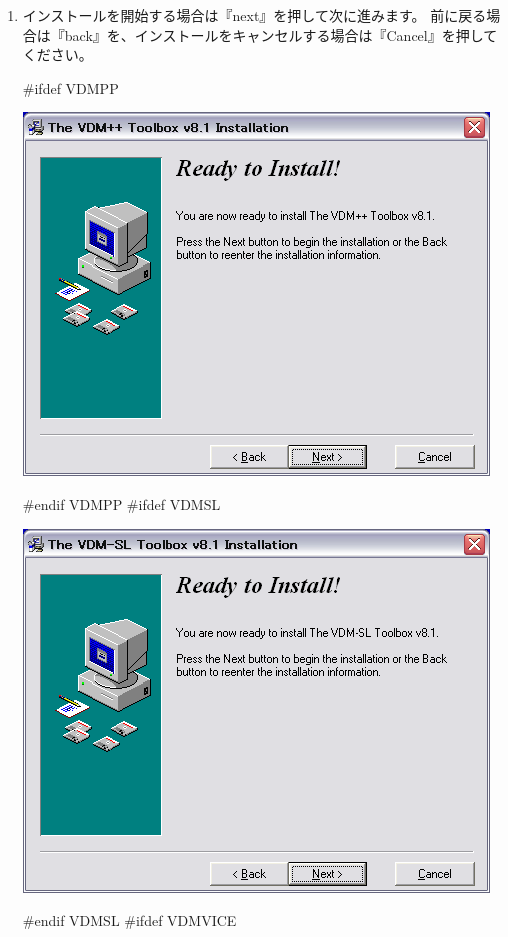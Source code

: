 \documentclass[\pformat,12pt]{jarticle}
\begin{document}
\begin{enumerate}
\item インストールを開始する場合は『next』を押して次に進みます。
前に戻る場合は『back』を、インストールをキャンセルする場合は『Cancel』を押してください。

#ifdef VDMPP
\begin{center}
\includegraphics[scale=0.42,bb=0 0 467 364]{install_pp_third.png}
\end{center}
#endif VDMPP
#ifdef VDMSL
\begin{center}
\includegraphics[scale=0.42, bb=0 0 467 364, clip]{install_sl_third.png}
\end{center}
#endif VDMSL
#ifdef VDMVICE
\begin{center}

\end{center}
\end{enumerate}
\end{document}
